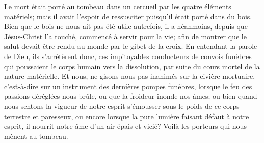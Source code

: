 Le mort était porté au tombeau dans un cercueil
	par les quatre éléments matériels;
	mais il avait l’espoir de ressusciter puisqu’il était porté dans du bois.
Bien que le bois ne nous ait pas été utile autrefois,
	il a néanmoins, depuis que Jésus-Christ l’a touché,
		commencé à servir pour la vie;
	afin de montrer que le salut devait être rendu au monde
		par le gibet de la croix.
En entendant la parole de Dieu, ils s’arrêtèrent donc,
	ces impitoyables conducteurs de convois funèbres
	qui poussaient le corps humain vers la dissolution,
	par suite du cours mortel de la nature matérielle.
Et nous, ne gisons-nous pas inanimés sur la civière mortuaire,
	c’est-à-dire sur un instrument des dernières pompes funèbres,
	lorsque le feu des passions déréglées nous brûle,
	ou que la froideur inonde nos âmes;
	ou bien quand nous sentons la vigueur de notre esprit
		s’émousser sous le poids de ce corps terrestre et paresseux,
	ou encore lorsque la pure lumière faisant défaut à notre esprit,
	il nourrit notre âme d’un air épais et vicié?
Voilà les porteurs qui nous mènent au tombeau.
